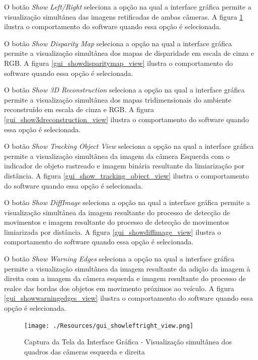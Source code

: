 O botão \textit{Show Left/Right} seleciona a opção na qual a interface gráfica permite a visualização simultânea das imagens retificadas de ambas câmeras. A figura \ref{gui_showleftright_view} 
ilustra o comportamento do software quando essa opção é selecionada. 

O botão \textit{Show Disparity Map} seleciona a opção na qual a interface gráfica permite a visualização simultânea dos mapas de disparidade em escala de cinza e RGB. A figura 
\ref{gui_showdisparitymap_view} ilustra o comportamento do software quando essa opção é selecionada. 

O botão \textit{Show 3D Reconstruction} seleciona a opção na qual a interface gráfica permite a visualização simultânea dos mapas tridimensionais do ambiente reconstruído em escala de cinza e 
RGB. A figura \ref{gui_show3dreconstruction_view} ilustra o comportamento do software quando essa opção é selecionada. 

O botão \textit{Show Tracking Object View} seleciona a opção na qual a interface gráfica permite a visualização simultânea da imagem da câmera Esquerda com o indicador de objeto rastreado e 
imagem binária resultante da limiarização por distância. A figura \ref{gui_show_tracking_object_view} ilustra o comportamento do software quando essa opção é selecionada. 

O botão \textit{Show DiffImage} seleciona a opção na qual a interface gráfica permite a visualização simultânea da imagem resultante do processo de detecção de movimentos e imagem resultante do 
processo de detecção de movimentos limiarizada por distância. A figura \ref{gui_showdiffimage_view} ilustra o comportamento do software quando essa opção é selecionada. 

O botão \textit{Show Warning Edges} seleciona a opção na qual a interface gráfica permite a visualização simultânea da imagem resultante da adição da imagem à direita com a imagem da câmera esquerda e imagem resultante do processo de realce das bordas dos objetos em movimento próximos ao veículo. A figura \ref{gui_showwarningedges_view} ilustra o comportamento do software quando essa opção é selecionada. 


\begin{figure}[H]
 	\centering
 	\texttt{[image: ./Resources/gui\_showleftright\_view.png]}
 	\caption{Captura da Tela da Interface Gráfica - Visualização simultânea dos quadros das câmeras esquerda e direita}
 	\label{gui_showleftright_view}
\end{figure}


